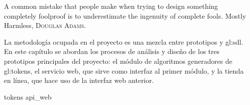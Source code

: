 %
%

{
  \epigrafe
  {%
    A common mistake that people make when trying to design something completely
    foolproof is to underestimate the ingenuity of complete fools.%
  }
  {%
    Mostly Harmless,
    \textsc{Douglas Adams}.%
  }
}

\noindent
La metodología ocupada en el proyecto es una mezcla entre prototipos y
\gls{gl:sdl}. En este capítulo se abordan los procesos de análisis y
diseño de los tres prototipos principales del proyecto: el módulo de
algoritmos generadores de \glspl{gl:token}, el servicio web, que sirve
como interfaz al primer módulo, y la tienda en línea, que hace uso de
la interfaz web anterior.

{tokens}
{api_web}
